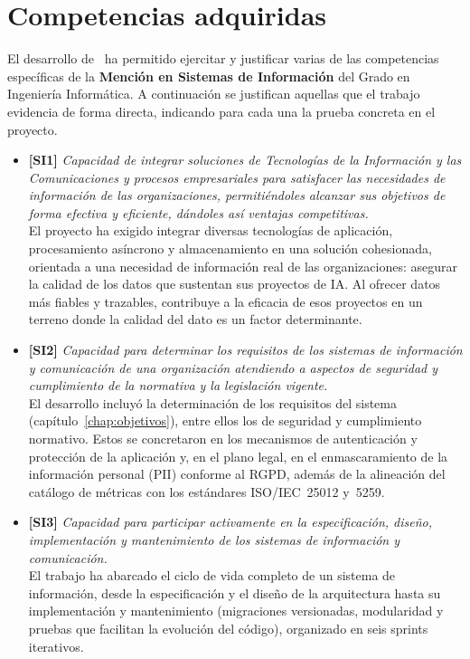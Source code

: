 \section{Competencias adquiridas}
\label{sec:competencias}

El desarrollo de \dataqual\ ha permitido ejercitar y justificar varias de las
competencias específicas de la \textbf{Mención en Sistemas de Información} del
Grado en Ingeniería Informática.  A continuación se justifican aquellas que el
trabajo evidencia de forma directa, indicando para cada una la prueba concreta
en el proyecto.

\begin{itemize}
  \item \textbf{[SI1]} \emph{Capacidad de integrar soluciones de Tecnologías de
    la Información y las Comunicaciones y procesos empresariales para satisfacer
    las necesidades de información de las organizaciones, permitiéndoles alcanzar
    sus objetivos de forma efectiva y eficiente, dándoles así ventajas
    competitivas.}\\
    El proyecto ha exigido integrar diversas tecnologías de aplicación,
    procesamiento asíncrono y almacenamiento en una solución cohesionada,
    orientada a una necesidad de información real de las organizaciones: asegurar
    la calidad de los datos que sustentan sus proyectos de \ac{IA}.  Al ofrecer
    datos más fiables y trazables, contribuye a la eficacia de esos proyectos en
    un terreno donde la calidad del dato es un factor determinante.

  \item \textbf{[SI2]} \emph{Capacidad para determinar los requisitos de los
    sistemas de información y comunicación de una organización atendiendo a
    aspectos de seguridad y cumplimiento de la normativa y la legislación
    vigente.}\\
    El desarrollo incluyó la determinación de los requisitos del sistema
    (capítulo~\ref{chap:objetivos}), entre ellos los de seguridad y cumplimiento
    normativo.  Estos se concretaron en los mecanismos de autenticación y
    protección de la aplicación y, en el plano legal, en el enmascaramiento de la
    información personal (\ac{PII}) conforme al \ac{RGPD}, además de la alineación
    del catálogo de métricas con los estándares \ac{ISO}/\ac{IEC}~25012 y~5259.

  \item \textbf{[SI3]} \emph{Capacidad para participar activamente en la
    especificación, diseño, implementación y mantenimiento de los sistemas de
    información y comunicación.}\\
    El trabajo ha abarcado el ciclo de vida completo de un sistema de
    información, desde la especificación y el diseño de la arquitectura hasta su
    implementación y mantenimiento (migraciones versionadas, modularidad y
    pruebas que facilitan la evolución del código), organizado en seis sprints
    iterativos.


\end{itemize}
